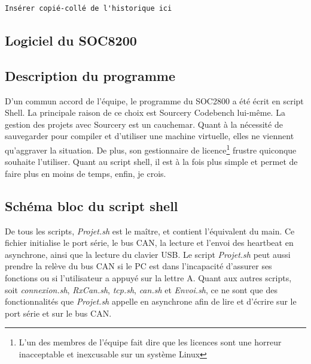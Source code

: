 \documentclass[10pt,a4paper,final]{article}
\begin{document}
\begin{verbatim}
Insérer copié-collé de l'historique ici
\end{verbatim}
\begin{spacing}{1.5}





\pagebreak
\section{Logiciel du SOC8200}
\subsection{Description du programme}
D'un commun accord de l'équipe, le programme du SOC2800 a été écrit en script Shell. La principale raison de ce choix est Sourcery Codebench lui-même. La gestion des projets avec Sourcery est un cauchemar. Quant à la nécessité de sauvegarder pour compiler et d'utiliser une machine virtuelle, elles ne viennent qu'aggraver la situation. De plus, son gestionnaire de licence\footnote{L'un des membres de l'équipe fait dire que les licences sont une horreur inacceptable et inexcusable sur un système Linux} frustre quiconque souhaite l'utiliser. Quant au script shell, il est à la fois plus simple et permet de faire plus en moins de temps, enfin, je crois.

\subsection{Schéma bloc du script shell}
De tous les scripts, \textit{Projet.sh} est le maître, et contient l'équivalent du main. Ce fichier initialise le port série, le bus CAN, la lecture et l'envoi des heartbeat en asynchrone, ainsi que la lecture du clavier USB. Le script \textit{Projet.sh} peut aussi prendre la relève du bus CAN si le PC est dans l'incapacité d'assurer ses fonctions ou si l'utilisateur a appuyé sur la lettre A. Quant aux autres scripts, soit \textit{connexion.sh}, \textit{RxCan.sh}, \textit{tcp.sh}, \textit{can.sh} et \textit{Envoi.sh}, ce ne sont que des fonctionnalités que \textit{Projet.sh} appelle en asynchrone afin de lire et d'écrire sur le port série et sur le bus CAN.


\end{spacing}
\end{document}
